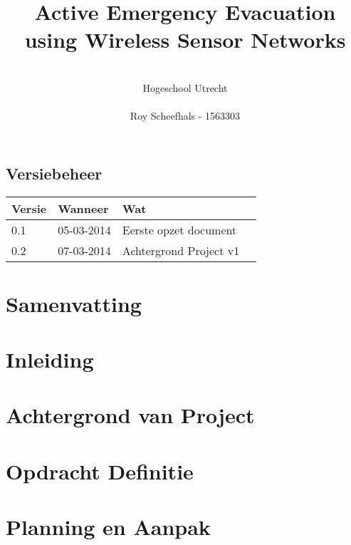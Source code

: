 \documentclass{../local}
\title{\textbf{Active Emergency Evacuation using Wireless Sensor Networks}}
\author{\\
		Hogeschool Utrecht\\
		\\
		Roy Scheefhals - 1563303}
\begin{document}
 
\maketitle
\newpage\null\thispagestyle{empty}

\renewcommand{\thesection}{\Roman{section}}

\section*{Versiebeheer}
\begin{tabular}{ | l | l | l | p{7.5cm} |}
\hline
Versie & Wanneer & Wat \\ \hline
0.1 & 05-03-2014 & Eerste opzet document\\ \hline
0.2 & 07-03-2014 & Achtergrond Project v1\\ \hline

\end{tabular}
\clearpage

\chapter{Samenvatting}

\clearpage

\chapter{Inleiding}

\clearpage

\newpage\null\thispagestyle{empty}

\renewcommand{\thesection}{\arabic{section}}

\renewcommand*\contentsname{Inhoud}
\thispagestyle{empty}
\setcounter{page}{0}
\tableofcontents
\clearpage

\chapter{Achtergrond van Project} 


\chapter{Opdracht Definitie}


\chapter{Planning en Aanpak}


%
%


%
\end{document}
